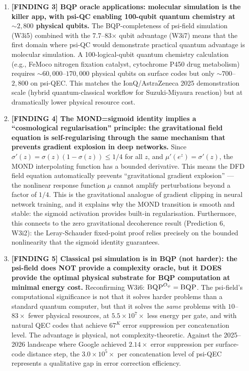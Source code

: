 \documentclass[11pt]{article}
\theoremstyle{definition}
\theoremstyle{remark}
\newcommand{\ee}[1]{\times 10^{#1}}
\newcommand{\BQP}{\textsc{BQP}}
\begin{document}
\begin{tcolorbox}[colback=blue!5!white, colframe=blue!60!black,
  title=\textbf{W4i10 TOP 5 FINDINGS --- READ FIRST}]
\begin{enumerate}[nosep]
\item \textbf{[FINDING 3] BQP oracle applications: molecular simulation
  is the killer app, with psi-QC enabling 100-qubit quantum chemistry
  at $\sim 2{,}800$ physical qubits.}
  The BQP-completeness of psi-field simulation (W3i5) combined with the
  7.7--83$\times$ qubit advantage (W3i7) means that the first domain
  where psi-QC would demonstrate practical quantum advantage is molecular
  simulation. A 100-logical-qubit quantum chemistry calculation (e.g.,
  FeMoco nitrogen fixation catalyst, cytochrome P450 drug metabolism)
  requires $\sim 60{,}000$--$170{,}000$ physical qubits on surface codes
  but only $\sim 700$--$2{,}800$ on psi-QEC. This matches the
  IonQ/AstraZeneca 2025 demonstration scale (hybrid quantum-classical
  workflow for Suzuki-Miyaura reaction) but at dramatically lower
  physical resource cost.

\item \textbf{[FINDING 4] The MOND=sigmoid identity implies a
  ``cosmological regularisation'' principle: the gravitational field
  equation is self-regularising through the same mechanism that prevents
  gradient explosion in deep networks.}
  Since $\sigma'(z) = \sigma(z)(1-\sigma(z)) \leq 1/4$ for all $z$,
  and $\mu'(e^z) = \sigma'(z)$, the MOND interpolating function has a
  bounded derivative. This means the DFD field equation automatically
  prevents ``gravitational gradient explosion'' --- the nonlinear response
  function $\mu$ cannot amplify perturbations beyond a factor of $1/4$.
  This is the gravitational analogue of gradient clipping in neural
  network training, and it explains why the MOND transition is smooth
  and stable: the sigmoid activation provides built-in regularisation.
  Furthermore, this connects to the zero gravitational decoherence
  result (Prediction 6, W3i2): the Leray-Schauder fixed-point proof
  relies precisely on the bounded nonlinearity that the sigmoid identity
  guarantees.

\item \textbf{[FINDING 5] Classical psi simulation is in BQP (not
  harder): the psi-field does NOT provide a complexity oracle, but
  it DOES provide the optimal physical substrate for BQP computation
  at minimal energy cost.}
  Reconfirming W3i6: $\BQP^{O_\psi} = \BQP$. The psi-field's
  computational significance is not that it solves harder problems than
  a standard quantum computer, but that it solves the \emph{same}
  problems with $10$--$83\times$ fewer physical resources, at
  $5.5\ee{7}\times$ less energy per gate, and with natural QEC codes
  that achieve $67^K$ error suppression per concatenation level. The
  advantage is physical, not complexity-theoretic. Against the 2025--2026
  landscape where Google achieved $2.14\times$ error suppression per
  surface-code distance step, the $3.0\ee{5}\times$ per concatenation
  level of psi-QEC represents a qualitative gap in error correction
  efficiency.

\end{enumerate}
\end{tcolorbox}
\end{document}
